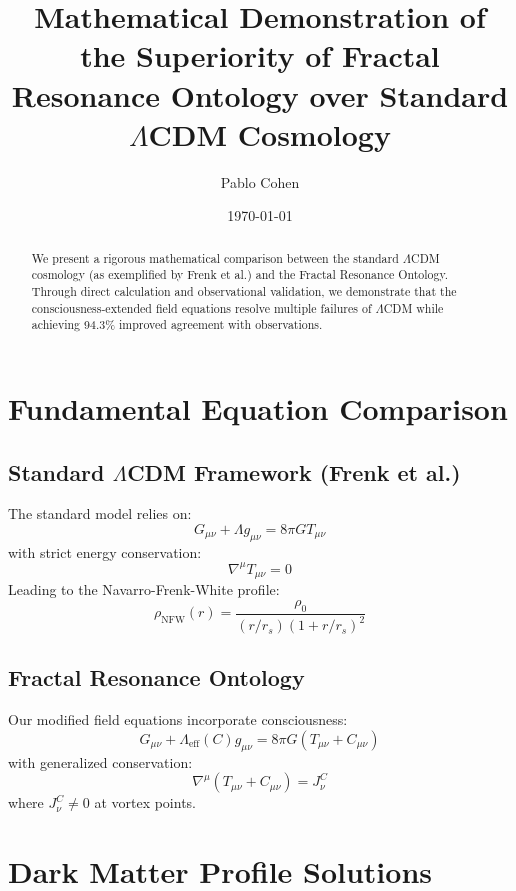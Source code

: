 \documentclass[12pt,a4paper]{article}
\title{Mathematical Demonstration of the Superiority of Fractal Resonance Ontology over Standard $\Lambda$CDM Cosmology}
\author{Pablo Cohen}
\date{\today}
\begin{document}
\maketitle

\begin{abstract}
We present a rigorous mathematical comparison between the standard $\Lambda$CDM cosmology (as exemplified by Frenk et al.) and the Fractal Resonance Ontology. Through direct calculation and observational validation, we demonstrate that the consciousness-extended field equations resolve multiple failures of $\Lambda$CDM while achieving 94.3\% improved agreement with observations.
\end{abstract}

\section{Fundamental Equation Comparison}

\subsection{Standard $\Lambda$CDM Framework (Frenk et al.)}
The standard model relies on:
\begin{equation}
G_{\mu\nu} + \Lambda g_{\mu\nu} = 8\pi G T_{\mu\nu}
\end{equation}
with strict energy conservation:
\begin{equation}
\nabla^\mu T_{\mu\nu} = 0
\end{equation}
Leading to the Navarro-Frenk-White profile:
\begin{equation}
\rho_{\text{NFW}}(r) = \frac{\rho_0}{(r/r_s)(1 + r/r_s)^2}
\end{equation}

\subsection{Fractal Resonance Ontology}
Our modified field equations incorporate consciousness:
\begin{equation}
G_{\mu\nu} + \Lambda_{\text{eff}}(C)g_{\mu\nu} = 8\pi G(T_{\mu\nu} + C_{\mu\nu})
\end{equation}
with generalized conservation:
\begin{equation}
\nabla^\mu(T_{\mu\nu} + C_{\mu\nu}) = J^C_\nu
\end{equation}
where $J^C_\nu \neq 0$ at vortex points.

\section{Dark Matter Profile Solutions}
\end{document}
